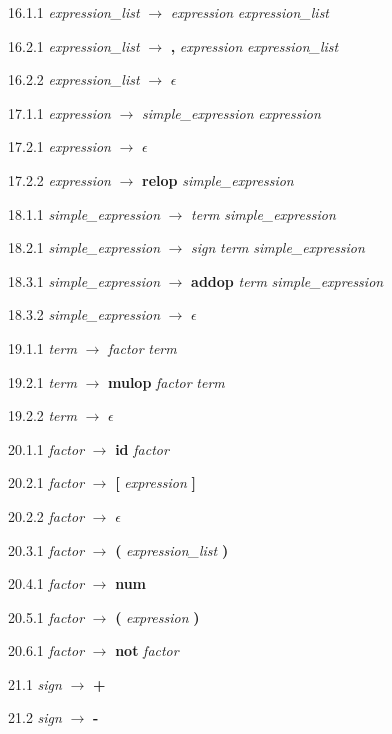16.1.1 \emph{expression\_list} $\rightarrow$ \emph{expression} \emph{expression\_list\textprime}

16.2.1 \emph{expression\_list\textprime} $\rightarrow$ \textbf{,} \emph{expression} \emph{expression\_list\textprime}

16.2.2 \emph{expression\_list\textprime} $\rightarrow$ $\epsilon$

17.1.1 \emph{expression} $\rightarrow$ \emph{simple\_expression} \emph{expression\textprime}

17.2.1 \emph{expression\textprime} $\rightarrow$ $\epsilon$

17.2.2 \emph{expression\textprime} $\rightarrow$ \textbf{relop} \emph{simple\_expression}

18.1.1 \emph{simple\_expression} $\rightarrow$ \emph{term} \emph{simple\_expression\textprime}

18.2.1 \emph{simple\_expression} $\rightarrow$ \emph{sign} \emph{term} \emph{simple\_expression\textprime}

18.3.1 \emph{simple\_expression\textprime} $\rightarrow$ \textbf{addop} \emph{term} \emph{simple\_expression\textprime}

18.3.2 \emph{simple\_expression\textprime} $\rightarrow$ $\epsilon$

19.1.1 \emph{term} $\rightarrow$ \emph{factor} \emph{term\textprime}

19.2.1 \emph{term\textprime} $\rightarrow$ \textbf{mulop} \emph{factor} \emph{term\textprime}

19.2.2 \emph{term\textprime} $\rightarrow$ $\epsilon$

20.1.1 \emph{factor} $\rightarrow$ \textbf{id} \emph{factor\textprime}

20.2.1 \emph{factor\textprime} $\rightarrow$ \textbf{[} \emph{expression} \textbf{]}

20.2.2 \emph{factor\textprime} $\rightarrow$ $\epsilon$

20.3.1 \emph{factor\textprime} $\rightarrow$ \textbf{(} \emph{expression\_list} \textbf{)}

20.4.1 \emph{factor} $\rightarrow$ \textbf{num}

20.5.1 \emph{factor} $\rightarrow$ \textbf{(} \emph{expression} \textbf{)}

20.6.1 \emph{factor} $\rightarrow$ \textbf{not} \emph{factor}

21.1 \emph{sign} $\rightarrow$ \textbf{+}

21.2 \emph{sign} $\rightarrow$ \textbf{-}
% 